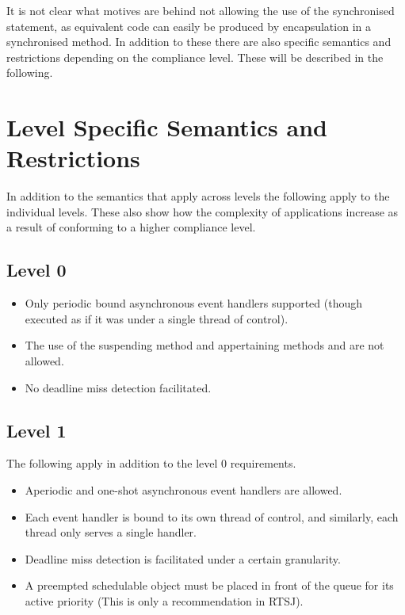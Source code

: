 It is not clear what motives are behind not allowing the use of the synchronised statement, as equivalent code can easily be produced by encapsulation in a synchronised method.
In addition to these there are also specific semantics and restrictions depending on the compliance level. These will be described in the following.


\section{Level Specific Semantics and Restrictions} %
\label{sub:level_specific_restrictions}
In addition to the semantics that apply across levels the following apply to the individual levels. These also show how the complexity of applications increase as a result of conforming to a higher compliance level.

\subsection{Level 0}
\begin{itemize}
	\item Only periodic bound asynchronous event handlers supported (though executed as if it was under a single thread of control).
	\item The use of the suspending method  and appertaining methods  and  are not allowed.
	\item No deadline miss detection facilitated.
\end{itemize}

\subsection{Level 1}
The following apply in addition to the level 0 requirements.
\begin{itemize}
	\item Aperiodic and one-shot asynchronous event handlers are allowed.
	\item Each event handler is bound to its own thread of control, and similarly, each thread only serves a single handler.
	\item Deadline miss detection is facilitated under a certain granularity.
	\item A preempted schedulable object must be placed in front of the queue for its active priority (This is only a recommendation in RTSJ).
\end{itemize}

